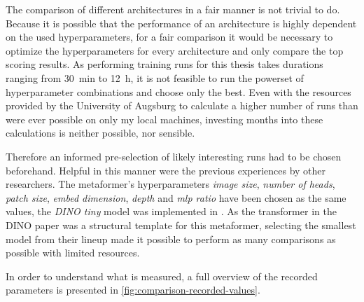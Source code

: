 The comparison of different architectures in a fair manner is not trivial to do.
Because it is possible that the performance of an architecture is highly dependent on the used hyperparameters, for a fair comparison it would be necessary to optimize the hyperparameters for every architecture and only compare the top scoring results.
As performing training runs for this thesis takes durations ranging from \SI[]{30}[]{\minute} to \SI[]{12}[]{\hour}, it is not feasible to run the powerset of hyperparameter combinations and choose only the best.
Even with the resources provided by the University of Augsburg to calculate a higher number of runs than were ever possible on only my local machines, investing months into these calculations is neither possible, nor sensible.

Therefore an informed pre-selection of likely interesting runs had to be chosen beforehand.
Helpful in this manner were the previous experiences by other researchers. 
The metaformer's hyperparameters \emph{image size}, \emph{number of heads}, \emph{patch size}, \emph{embed dimension}, \emph{depth} and \emph{mlp ratio} have been chosen as the same values, the \emph{DINO tiny} model was implemented in \cite{dinoGithub}. As the transformer in the DINO paper \cite{dinoPaper} was a structural template for this metaformer, selecting the smallest model from their lineup made it possible to perform as many comparisons as possible with limited resources.

In order to understand what is measured, a full overview of the recorded parameters is presented in \autoref{fig:comparison-recorded-values}.

